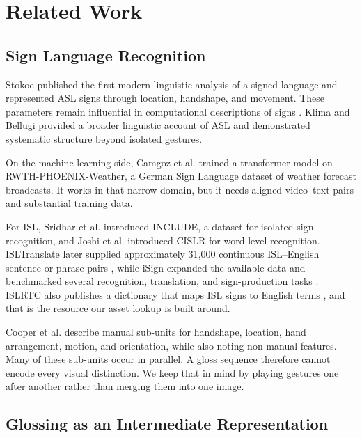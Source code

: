\documentclass[conference]{IEEEtran}
\begin{document}
\section{Related Work}
\label{sec:related}

\subsection{Sign Language Recognition}

Stokoe \cite{stokoe1960} published the first modern linguistic analysis of a signed language and represented ASL signs through location, handshape, and movement. These parameters remain influential in computational descriptions of signs \cite{cooper2012}. Klima and Bellugi \cite{klima1979} provided a broader linguistic account of ASL and demonstrated systematic structure beyond isolated gestures.

On the machine learning side, Camgoz et al. \cite{camgoz2020} trained a transformer model on RWTH-PHOENIX-Weather, a German Sign Language dataset of weather forecast broadcasts. It works in that narrow domain, but it needs aligned video--text pairs and substantial training data.

For ISL, Sridhar et al. \cite{sridhar2020} introduced INCLUDE, a dataset for isolated-sign recognition, and Joshi et al. \cite{joshi2022cislr} introduced CISLR for word-level recognition. ISLTranslate later supplied approximately 31{,}000 continuous ISL--English sentence or phrase pairs \cite{joshi2023isltranslate}, while iSign expanded the available data and benchmarked several recognition, translation, and sign-production tasks \cite{joshi2024isign}. ISLRTC also publishes a dictionary that maps ISL signs to English terms \cite{islrtc2021}, and that is the resource our asset lookup is built around.

Cooper et al. \cite{cooper2012} describe manual sub-units for handshape, location, hand arrangement, motion, and orientation, while also noting non-manual features. Many of these sub-units occur in parallel. A gloss sequence therefore cannot encode every visual distinction. We keep that in mind by playing gestures one after another rather than merging them into one image.

\subsection{Glossing as an Intermediate Representation}
\end{document}
